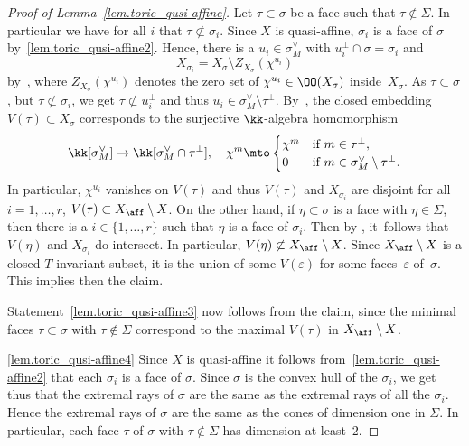 \begin{proof}[Proof of Lemma~\ref{lem.toric_qusi-affine}]
Let $\tau \subset \sigma$ be a face such that
$\tau \not\in \Sigma$. In particular we have for all $i$ that $\tau \not\subset \sigma_i$.
Since $X$ is quasi-affine, $\sigma_i$ is a face of $\sigma$ by~\eqref{lem.toric_qusi-affine2}.
Hence, there is a $u_i \in \sigma^\vee_M$ with $u_i^\bot \cap \sigma = \sigma_i$ and
\[
X_{\sigma_i} = X_\sigma \setminus Z_{X_{\sigma}}(\chi^{u_i})
\]
by~\cite[\S1.3 Lem.]{Fu1993Introduction-to-to}, where $Z_{X_{\sigma}}(\chi^{u_i})$ denotes
the zero set of $\chi^{u_i} \in \OO(X_{\sigma})$ inside~$X_{\sigma}$.
As $\tau \subset \sigma$, but $\tau \not\subset \sigma_i$, we get
$\tau \not\subset u_i^\bot$ and thus $u_i \in \sigma_M^\vee \setminus \tau^\bot$.
By~\cite[\S3.1]{Fu1993Introduction-to-to}, the
closed embedding $V(\tau) \subset X_\sigma$ corresponds to the surjective $\kk$-algebra homomorphism
\[
\kk[\sigma^{\vee}_M] \to \kk[\sigma^{\vee}_M \cap \tau^{\bot}],
\quad
\chi^m \mto \begin{cases}
\chi^m & \textrm{if $m \in \tau^{\bot}$}, \\
0 & \textrm{if $m \in \sigma_M^\vee \setminus \tau^\bot$}.
\end{cases}
\]
In particular, $\chi^{u_i}$ vanishes on $V(\tau)$ and thus $V(\tau)$
and $X_{\sigma_i}$ are disjoint for all $i=1, \ldots, r$,
\ie $V(\tau) \subset X_{\aff} \setminus X$.
On the other hand, if $\eta \subset \sigma$ is a face with $\eta \in \Sigma$, then there is a
$i \in \{1, \ldots, r\}$ such that $\eta$ is a face of $\sigma_i$. Then by
\cite[\S3.1, p.\,53]{Fu1993Introduction-to-to},
it~follows that $V(\eta)$ and $X_{\sigma_i}$ do intersect. In particular,
$V(\eta) \not\subset X_{\aff} \setminus X$.
Since $X_{\aff} \setminus X$ is a closed $T$-invariant subset,
it is the union of some $V(\varepsilon)$ for some faces~$\varepsilon$ of~$\sigma$.
This implies then the claim.

Statement~\eqref{lem.toric_qusi-affine3} now follows from the claim,
since the minimal faces $\tau \subset \sigma$ with $\tau \not\in \Sigma$
correspond to the maximal $V(\tau)$ in $X_{\aff} \setminus X$.

\eqref{lem.toric_qusi-affine4}
Since $X$ is quasi-affine it follows from~\eqref{lem.toric_qusi-affine2}
that each $\sigma_i$ is a face of $\sigma$. Since $\sigma$ is the convex hull of the $\sigma_i$,
we get thus that the extremal rays of $\sigma$ are the same as the extremal rays of all the $\sigma_i$.
Hence the extremal rays of $\sigma$ are the same as the cones of dimension one in $\Sigma$. In particular,
each face $\tau$ of $\sigma$ with $\tau \not\in \Sigma$ has dimension at least~$2$.
\end{proof}

